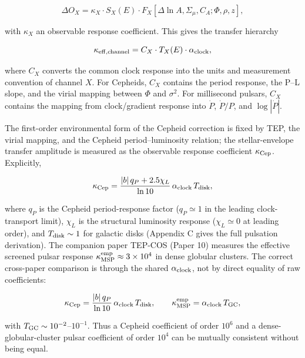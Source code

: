 \documentclass[
]{article}
\begin{document}
\begin{equation}
\Delta O_X = \kappa_X \cdot S_X(E) \cdot F_X[\Delta\ln A, \Sigma_\mu, C_A; \Phi, \rho, z] ,
\end{equation}

with \(\kappa_X\) an observable response coefficient. This gives the
transfer hierarchy

\begin{equation}
\kappa_{\rm eff,channel} = C_X \cdot T_X(E) \cdot \alpha_{\rm clock} ,
\label{eq:transfer_hierarchy}
\end{equation}

where \(C_X\) converts the common clock response into the units and
measurement convention of channel \(X\). For Cepheids, \(C_X\) contains
the period response, the P--L slope, and the virial mapping between
\(\Phi\) and \(\sigma^2\). For millisecond pulsars, \(C_X\) contains the
mapping from clock/gradient response into \(\dot P\), \(\dot P/P\), and
\(\log|\dot P|\).

The first-order environmental form of the Cepheid correction is fixed by
TEP, the virial mapping, and the Cepheid period--luminosity relation;
the stellar-envelope transfer amplitude is measured as the observable
response coefficient \(\kappa_{\rm Cep}\). Explicitly,

\begin{equation}
\kappa_{\rm Cep} = \frac{|b|\,q_P + 2.5\chi_L}{\ln 10}\,\alpha_{\rm clock}\,T_{\rm disk} ,
\end{equation}

where \(q_P\) is the Cepheid period-response factor (\(q_P \simeq 1\) in
the leading clock-transport limit), \(\chi_L\) is the structural
luminosity response (\(\chi_L \simeq 0\) at leading order), and
\(T_{\rm disk} \sim 1\) for galactic disks (Appendix C gives the full
pulsation derivation). The companion paper TEP-COS (Paper 10) measures
the effective screened pulsar response
\(\kappa_{\rm MSP}^{\rm emp} \approx 3 \times 10^4\) in dense globular
clusters. The correct cross-paper comparison is through the shared
\(\alpha_{\rm clock}\), not by direct equality of raw coefficients:

\begin{equation}
\kappa_{\rm Cep} = \frac{|b|\,q_P}{\ln 10}\,\alpha_{\rm clock}\,T_{\rm disk}, \qquad
\kappa_{\rm MSP}^{\rm emp} = \alpha_{\rm clock}\,T_{\rm GC} ,
\end{equation}

with \(T_{\rm GC} \sim 10^{-2}\)--\(10^{-1}\). Thus a Cepheid
coefficient of order \(10^6\) and a dense-globular-cluster pulsar
coefficient of order \(10^4\) can be mutually consistent without being
equal.
\end{document}
